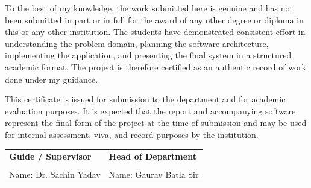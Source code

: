 \documentclass[11pt,oneside]{report}
\newcommand{\GuideName}{Dr. Sachin Yadav}
\begin{document}
To the best of my knowledge, the work submitted here is genuine and has not been submitted in part or in full for the award of any other degree or diploma in this or any other institution. The students have demonstrated consistent effort in understanding the problem domain, planning the software architecture, implementing the application, and presenting the final system in a structured academic format. The project is therefore certified as an authentic record of work done under my guidance.

This certificate is issued for submission to the department and for academic evaluation purposes. It is expected that the report and accompanying software represent the final form of the project at the time of submission and may be used for internal assessment, viva, and record purposes by the institution.

\vfill
\begin{tabular}{p{}p{}}
\textbf{Guide / Supervisor} & \textbf{Head of Department} \\
\vspace{1.5cm} & \vspace{1.5cm} \\
Name: \GuideName & Name: Gaurav Batla Sir \\

\end{tabular}
\end{document}
